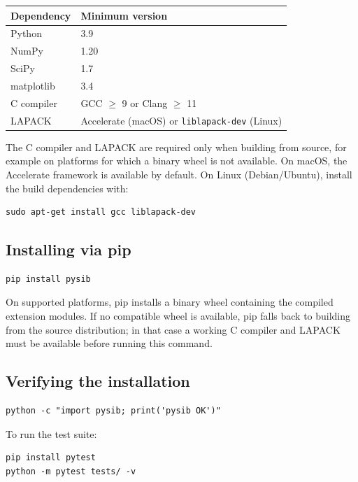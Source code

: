\documentclass[11pt,a4paper]{article}
\begin{document}
\begin{center}
\begin{tabular}{ll}
  \toprule
  Dependency & Minimum version \\
  \midrule
  Python     & 3.9  \\
  NumPy      & 1.20 \\
  SciPy      & 1.7  \\
  matplotlib & 3.4  \\
  \midrule
  C compiler & GCC $\geq$ 9 or Clang $\geq$ 11 \\
  LAPACK     & Accelerate (macOS) or \texttt{liblapack-dev} (Linux) \\
  \bottomrule
\end{tabular}
\end{center}

The C compiler and LAPACK are required only when building from source,
for example on platforms for which a binary wheel is not available.
On macOS, the Accelerate framework is available by default.
On Linux (Debian/Ubuntu), install the build dependencies with:

\begin{lstlisting}
sudo apt-get install gcc liblapack-dev
\end{lstlisting}

\subsection{Installing via pip}

\begin{lstlisting}
pip install pysib
\end{lstlisting}

On supported platforms, pip installs a binary wheel containing the
compiled extension modules.  If no compatible wheel is available, pip
falls back to building from the source distribution; in that case a
working C compiler and LAPACK must be available before running this
command.

\subsection{Verifying the installation}

\begin{lstlisting}
python -c "import pysib; print('pysib OK')"
\end{lstlisting}

To run the test suite:

\begin{lstlisting}
pip install pytest
python -m pytest tests/ -v
\end{lstlisting}
\end{document}
